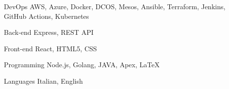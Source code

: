 

\begin{cvskills}

  \cvskill
    {DevOps} %
    {AWS, Azure, Docker, DCOS, Mesos, Ansible, Terraform, Jenkins, GitHub Actions, Kubernetes} %

  \cvskill
    {Back-end} %
    {Express, REST API} %

  \cvskill
    {Front-end} %
    {React, HTML5, CSS} %

  \cvskill
    {Programming} %
    {Node.js, Golang, JAVA, Apex, LaTeX} %

  \cvskill
    {Languages} %
    {Italian, English} %

\end{cvskills}
